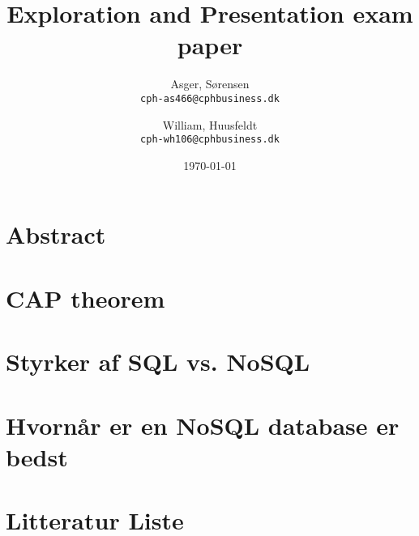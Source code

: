\documentclass[10pt]{report}
\title{Exploration and Presentation exam paper}
\author{
    Asger, Sørensen\\
    \texttt{cph-as466@cphbusiness.dk}\\
    \and
    William, Huusfeldt\\
    \texttt{cph-wh106@cphbusiness.dk}\\
  }
\date{\today}
\begin{document}
\hypersetup{pageanchor=false}
\begin{titlepage}
\maketitle
\newpage
\tableofcontents
\newpage

\chapter{Abstract}


\chapter{CAP theorem}


\chapter{Styrker af SQL vs. NoSQL}


\chapter{Hvornår er en NoSQL database er bedst}


\chapter{Litteratur Liste}


\end{titlepage}
\end{document}

